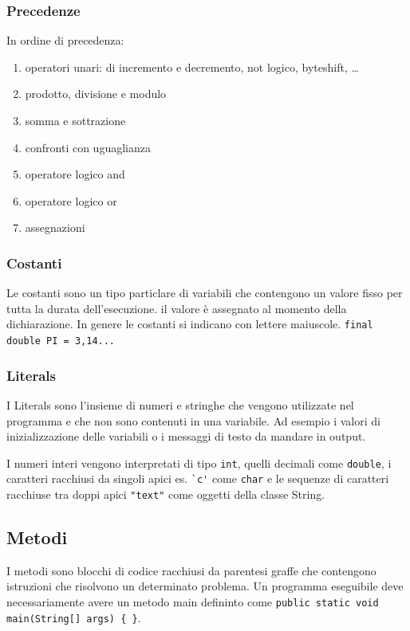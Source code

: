 \documentclass{article}
\begin{document}
\subsubsection*{Precedenze}
In ordine di precedenza:
\begin{enumerate}[topsep=3pt, itemsep=0pt]
	\item operatori unari: di incremento e decremento, not logico, byteshift, \dots
	\item prodotto, divisione e modulo
	\item somma e sottrazione
	\item confronti con uguaglianza
	\item operatore logico and
	\item operatore logico or
	\item assegnazioni
\end{enumerate}

\subsubsection*{Costanti}
Le costanti sono un tipo particlare di variabili che contengono un valore fisso per tutta la durata dell'esecuzione.
il valore è assegnato al momento della dichiarazione. In genere le costanti si indicano con lettere maiuscole.
\verb|final double PI = 3,14...|

\subsubsection*{Literals}
I Literals sono l'insieme di numeri e stringhe che vengono utilizzate nel programma e che non sono contenuti in una variabile.
Ad esempio i valori di inizializzazione delle variabili o i messaggi di testo da mandare in output.

I numeri interi vengono interpretati di tipo \verb|int|, quelli decimali come \verb|double|, i caratteri racchiusi da singoli
apici es. \verb|`c'| come \verb|char| e le sequenze di caratteri racchiuse tra doppi apici \verb|"text"| come oggetti della
classe String.

\newpage


\subsection{Metodi}
I metodi sono blocchi di codice racchiusi da parentesi graffe che contengono istruzioni che risolvono un determinato problema.
Un programma eseguibile deve necessariamente avere un metodo main defininto come \verb|public static void main(String[] args) { }|.
\end{document}
